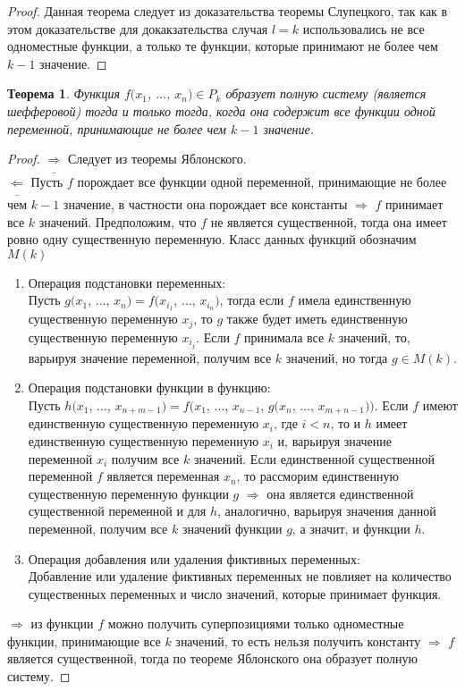 \documentclass[a4paper, 12pt]{article}
\theoremstyle{definition}
\theoremstyle{plain}
\newtheorem*{theorem}{Теорема}
\theoremstyle{remark}
\begin{document}
  \begin{proof}
    Данная теорема следует из доказательства теоремы Слупецкого, так как в этом доказательстве для докакзательства случая $l=k$ использовались не все одноместные функции, а только те функции, которые принимают не более чем $k-1$ значение.
  \end{proof}
  \begin{theorem}
    Функция $f(x_1$, $\ldots$, $x_n)\in P_k$ образует полную систему (является шефферовой) тогда и только тогда, когда она содержит все функции одной переменной, принимающие не более чем $k-1$ значение.
  \end{theorem}
  \begin{proof}
    $\underline{\Longrightarrow}$ Следует из теоремы Яблонского.\\
    $\underline{\Longleftarrow}$ Пусть $f$ порождает все функции одной переменной, принимающие не более чем $k-1$ значение, в частности она порождает все константы $\Longrightarrow$ $f$ принимает все $k$ значений. Предположим, что $f$ не является существенной, тогда она имеет ровно одну существенную переменную. Класс данных функций обозначим $M(k)$\\
    \begin{enumerate}
      \item Операция подстановки переменных:\\
      Пусть $g(x_1$, $\ldots$, $x_n)=f(x_{i_1}$, $\ldots$, $x_{i_n})$, тогда если $f$ имела единственную существенную переменную $x_j$, то $g$ также будет иметь единственную существенную переменную $x_{i_j}$. Если $f$ принимала все $k$ значений, то, варьируя значение переменной, получим все $k$ значений, но тогда $g\in M(k)$.
      \item Операция подстановки функции в функцию:\\
      Пусть $h(x_1$, $\ldots$, $x_{n+m-1})=f(x_1$, $\ldots$, $x_{n-1}$, $g(x_n$, $\ldots$, $x_{m+n-1}))$. Если $f$ имеют единственную существенную переменную $x_i$, где $i<n$, то и $h$ имеет единственную существенную переменную $x_i$ и, варьируя значение переменной $x_i$ получим все $k$ значений. Если единственной существенной переменной $f$ является переменная $x_n$, то рассморим единственную существенную переменную функции $g$ $\Longrightarrow$ она является единственной существенной переменной и для $h$, аналогично, варьируя значения данной переменной, получим все $k$ значений функции $g$, а значит, и функции $h$.
      \item Операция добавления или удаления фиктивных переменных:\\
      Добавление или удаление фиктивных переменных не повлияет на количество существенных переменных и число значений, которые принимает функция.
    \end{enumerate}
    $\Longrightarrow$ из функции $f$ можно получить суперпозициями только одноместные функции, принимающие все $k$ значений, то есть нельзя получить константу $\Longrightarrow$ $f$ является существенной, тогда по теореме Яблонского она образует полную систему.
  \end{proof}
\end{document}
